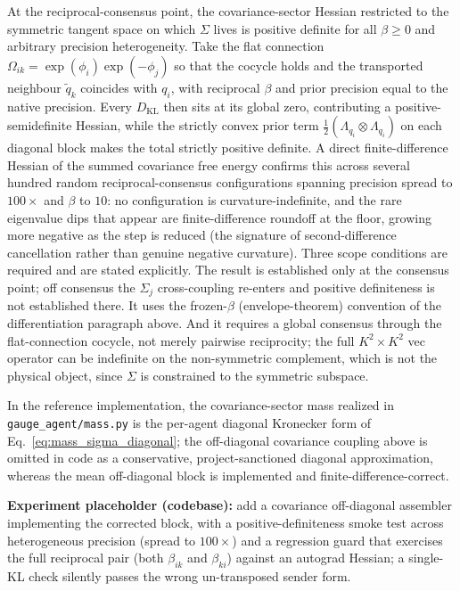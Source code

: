 \documentclass[11pt]{article}
\begin{document}
At the reciprocal-consensus point, the covariance-sector Hessian restricted to the symmetric tangent space on which $\Sigma$ lives is positive definite for all $\beta \geq 0$ and arbitrary precision heterogeneity. Take the flat connection $\Omega_{ik} = \exp(\phi_i)\exp(-\phi_j)$ so that the cocycle holds and the transported neighbour $\tilde{q}_k$ coincides with $q_i$, with reciprocal $\beta$ and prior precision equal to the native precision. Every $D_{\mathrm{KL}}$ then sits at its global zero, contributing a positive-semidefinite Hessian, while the strictly convex prior term $\frac{1}{2}(\Lambda_{q_i} \otimes \Lambda_{q_i})$ on each diagonal block makes the total strictly positive definite. A direct finite-difference Hessian of the summed covariance free energy confirms this across several hundred random reciprocal-consensus configurations spanning precision spread to $100\times$ and $\beta$ to $10$: no configuration is curvature-indefinite, and the rare eigenvalue dips that appear are finite-difference roundoff at the floor, growing more negative as the step is reduced (the signature of second-difference cancellation rather than genuine negative curvature). Three scope conditions are required and are stated explicitly. The result is established only at the consensus point; off consensus the $\Sigma_j$ cross-coupling re-enters and positive definiteness is not established there. It uses the frozen-$\beta$ (envelope-theorem) convention of the differentiation paragraph above. And it requires a global consensus through the flat-connection cocycle, not merely pairwise reciprocity; the full $K^2 \times K^2$ vec operator can be indefinite on the non-symmetric complement, which is not the physical object, since $\Sigma$ is constrained to the symmetric subspace.

In the reference implementation, the covariance-sector mass realized in \texttt{gauge\_agent/mass.py} is the per-agent diagonal Kronecker form of Eq.~\eqref{eq:mass_sigma_diagonal}; the off-diagonal covariance coupling above is omitted in code as a conservative, project-sanctioned diagonal approximation, whereas the mean off-diagonal block is implemented and finite-difference-correct.

\textbf{Experiment placeholder (codebase):} add a covariance off-diagonal assembler implementing the corrected block, with a positive-definiteness smoke test across heterogeneous precision (spread to $100\times$) and a regression guard that exercises the full reciprocal pair (both $\beta_{ik}$ and $\beta_{ki}$) against an autograd Hessian; a single-KL check silently passes the wrong un-transposed sender form.
\end{document}
